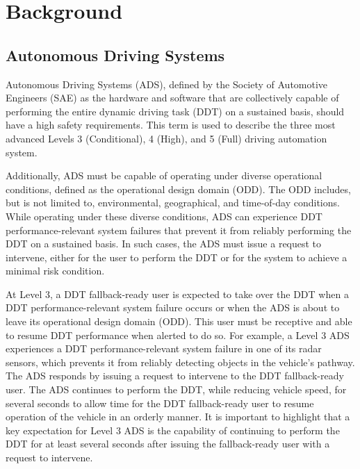 \section{Background}  \label{Background}



\subsection{Autonomous Driving Systems} \label{Background:ADS}


Autonomous Driving Systems (ADS), defined by the Society of Automotive Engineers (SAE) as the hardware and software that are collectively capable of performing the entire dynamic driving task (DDT) on a sustained basis, should have a high safety requirements.
This term is used to describe the three most advanced Levels 3 (Conditional), 4 (High), and 5 (Full) driving automation system.

Additionally, ADS must be capable of operating under diverse operational conditions, defined as the operational design domain (ODD). The ODD includes, but is not limited to, environmental, geographical, and time-of-day conditions.
While operating under these diverse conditions, ADS can experience DDT performance-relevant system failures that prevent it from reliably performing the DDT on a sustained basis.
In such cases, the ADS must issue a request to intervene, either for the user to perform the DDT or for the system to achieve a minimal risk condition.

At Level 3, a DDT fallback-ready user is expected to take over the DDT when a DDT performance-relevant system failure occurs or when the ADS is about to leave its operational design domain (ODD). This user must be receptive and able to resume DDT performance when alerted to do so.
For example, a Level 3 ADS experiences a DDT performance-relevant system failure in one of its radar sensors, which prevents it from reliably detecting objects in the vehicle's pathway. The ADS responds by issuing a request to intervene to the DDT fallback-ready user. The ADS continues to perform the DDT, while reducing vehicle speed, for several seconds to allow time for the DDT fallback-ready user to resume operation of the vehicle in an orderly manner. It is important to highlight that a key expectation for Level 3 ADS is the capability of continuing to perform the DDT for at least several seconds after issuing the fallback-ready user with a request to intervene.

